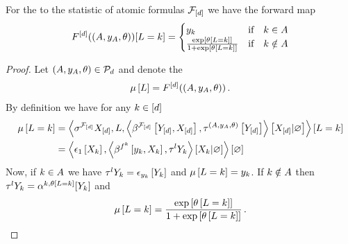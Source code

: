 \begin{theorem}
    For the \HybridLogicNetworks{} to the statistic of atomic formulas $\mathcal{F}_{[d]}$ we have the forward map
    \begin{align*}
        \forwardmapwrtof{\mlnatomsymbol}{\hybridparam}[\selvariable=\atomenumerator]
        = \begin{cases}
              \headindexof{\atomenumerator} & \text{if} \quad \atomenumerator\in\variableset \\
              \frac{\expof{\canparamat{\selvariable=\atomenumerator}}}{1+\expof{\canparamat{\selvariable=\atomenumerator}}} & \text{if} \quad \atomenumerator\notin\variableset %
        \end{cases}
    \end{align*}
\end{theorem}
\begin{proof}
    Let $(A,y_{A},\theta)\in\mathcal{P}_{d}$ and denote the
    \begin{align*}
        \mu\left[L\right] = F^{[d]}((A,y_{A},\theta)) \, .
    \end{align*}
    By definition we have for any $k\in[d]$
    \begin{align*}
        \mu\left[L=k\right]
        &= \left\langle \sigma^{\mathcal{F}_{[d]}}{X_{[d]},L},
            \left\langle \beta^{\mathcal{F}_{[d]}}\left[Y_{[d]},X_{[d]}\right],\tau^{(A,y_{A},\theta)}\left[Y_{[d]}\right]\right\rangle \left[ X_{[d]} | \varnothing \right]
        \right\rangle \left[ L=k \right] \\
        &= \left\langle \epsilon_{1}\left[X_{k}\right],
            \left\langle 
                \beta^{f^{k}}\left[y_{k},X_{k}\right],
                \tau^{l}{Y_{k}}\right\rangle \left[ X_{k} | \varnothing \right]
        \right\rangle \left[ \varnothing \right]
    \end{align*}
    Now, if $k\in A$ we have $\tau^{l}{Y_{k}}=\epsilon_{y_{k}}\left[Y_{k}\right]$ and $\mu\left[L=k\right]=y_{k}$.
    If $k\notin A$ then $\tau^{l}{Y_{k}}=\alpha^{k,\theta\left[L=k\right]}[Y_{k}]$ and
    \begin{align*}
        \mu\left[L=k\right] = \frac{\mathrm{exp}\left[\theta\left[L=k\right]\right]}{1+\mathrm{exp}\left[\theta\left[L=k\right]\right]} \, .
    \end{align*}
\end{proof}

